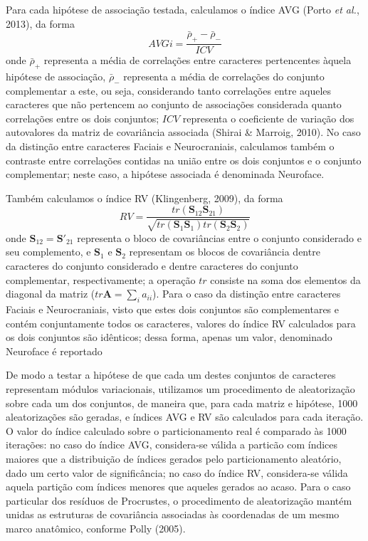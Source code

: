 \documentclass[11pt,]{article}
\begin{document}
Para cada hipótese de associação testada, calculamos o índice AVG (Porto
\emph{et al.}, 2013), da forma
\[ AVGi = \frac {\bar{\rho}_{+} - \bar{\rho}_{-}} {ICV} \] onde
$\bar{\rho}_{+}$ representa a média de correlações entre caracteres
pertencentes àquela hipótese de associação, $\bar{\rho}_{-}$ representa
a média de correlações do conjunto complementar a este, ou seja,
considerando tanto correlações entre aqueles caracteres que não
pertencem ao conjunto de associações considerada quanto correlações
entre os dois conjuntos; $ICV$ representa o coeficiente de variação dos
autovalores da matriz de covariância associada (Shirai \& Marroig,
2010). No caso da distinção entre caracteres Faciais e Neurocraniais,
calculamos também o contraste entre correlações contidas na união entre
os dois conjuntos e o conjunto complementar; neste caso, a hipótese
associada é denominada Neuroface.

Também calculamos o índice RV (Klingenberg, 2009), da forma \[
RV = \frac{tr(\mathbf{S}_{12}\mathbf{S}_{21})}{\sqrt{tr(\mathbf{S}_1 \mathbf{S}_1)tr(\mathbf{S}_2 \mathbf{S}_2)}}
\] onde $\mathbf{S}_{12} = \mathbf{S}'_{21}$ representa o bloco de
covariâncias entre o conjunto considerado e seu complemento, e
$\mathbf{S}_1$ e $\mathbf{S}_2$ representam os blocos de covariância
dentre caracteres do conjunto considerado e dentre caracteres do
conjunto complementar, respectivamente; a operação $tr$ consiste na soma
dos elementos da diagonal da matriz ($tr \mathbf{A} = \sum_i a_{ii}$).
Para o caso da distinção entre caracteres Faciais e Neurocraniais, visto
que estes dois conjuntos são complementares e contém conjuntamente todos
os caracteres, valores do índice RV calculados para os dois conjuntos
são idênticos; dessa forma, apenas um valor, denominado Neuroface é
reportado

De modo a testar a hipótese de que cada um destes conjuntos de
caracteres representam módulos variacionais, utilizamos um procedimento
de aleatorização sobre cada um dos conjuntos, de maneira que, para cada
matriz e hipótese, 1000 aleatorizações são geradas, e índices AVG e RV
são calculados para cada iteração. O valor do índice calculado sobre o
particionamento real é comparado às 1000 iterações: no caso do índice
AVG, considera-se válida a particão com índices maiores que a
distribuição de índices gerados pelo particionamento aleatório, dado um
certo valor de significância; no caso do índice RV, considera-se válida
aquela partição com índices menores que aqueles gerados ao acaso. Para o
caso particular dos resíduos de Procrustes, o procedimento de
aleatorização mantém unidas as estruturas de covariância associadas às
coordenadas de um mesmo marco anatômico, conforme Polly (2005).
\end{document}

